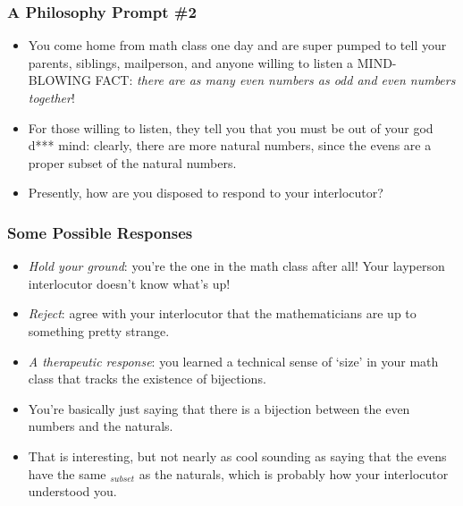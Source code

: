 \begin{frame}
\frametitle{A Philosophy Prompt \#2}

\begin{itemize}[<+->]

\item You come home from math class one day and are super pumped to tell your parents, siblings, mailperson, and anyone willing to listen a MIND-BLOWING FACT: \textit{there are as many even numbers as odd and even numbers together}!

\item For those willing to listen, they tell you that you must be out of your god d*** mind: clearly, there are more natural numbers, since the evens are a proper subset of the natural numbers. 

\item Presently, how are you disposed to respond to your interlocutor?




\end{itemize}
\end{frame}

\begin{frame}
\frametitle{Some Possible Responses}

\begin{itemize}[<+->]

\item \textit{Hold your ground}: you're the one in the math class after all! Your layperson interlocutor doesn't know what's up!

\item \textit{Reject}: agree with your interlocutor that the mathematicians are up to something pretty strange. 

\item \textit{A therapeutic response}: you learned a technical sense of `size' in your math class that tracks the existence of bijections. 
\bi
\item You're basically just saying that there is a bijection between the even numbers and the naturals. 
\item That is interesting, but not nearly as cool sounding as saying that the evens have the same $_{subset}$ as the naturals, which is probably how your interlocutor understood you.
\ei

\end{itemize}
\end{frame}



